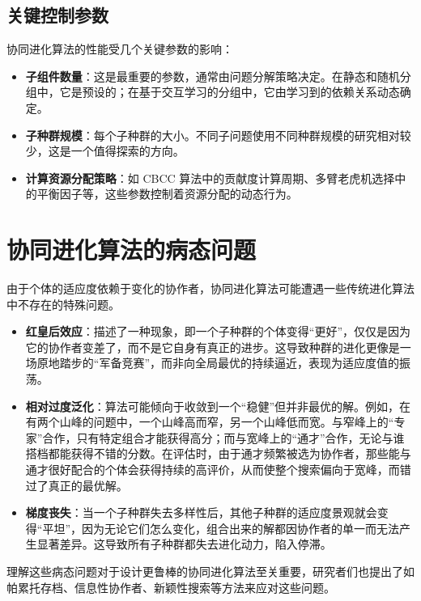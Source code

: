 \subsection{关键控制参数}
协同进化算法的性能受几个关键参数的影响：
    \begin{itemize}
        \item \textbf{子组件数量}：这是最重要的参数，通常由问题分解策略决定。在静态和随机分组中，它是预设的；在基于交互学习的分组中，它由学习到的依赖关系动态确定。
        \item \textbf{子种群规模}：每个子种群的大小。不同子问题使用不同种群规模的研究相对较少，这是一个值得探索的方向。
        \item \textbf{计算资源分配策略}：如 CBCC 算法中的贡献度计算周期、多臂老虎机选择中的平衡因子等，这些参数控制着资源分配的动态行为。
    \end{itemize}


\section{协同进化算法的病态问题}

由于个体的适应度依赖于变化的协作者，协同进化算法可能遭遇一些传统进化算法中不存在的特殊问题。

\begin{itemize}
    \item \textbf{红皇后效应}：描述了一种现象，即一个子种群的个体变得“更好”，仅仅是因为它的协作者变差了，而不是它自身有真正的进步。这导致种群的进化更像是一场原地踏步的“军备竞赛”，而非向全局最优的持续逼近，表现为适应度值的振荡。
    \item \textbf{相对过度泛化}：算法可能倾向于收敛到一个“稳健”但并非最优的解。例如，在有两个山峰的问题中，一个山峰高而窄，另一个山峰低而宽。与窄峰上的“专家”合作，只有特定组合才能获得高分；而与宽峰上的“通才”合作，无论与谁搭档都能获得不错的分数。在评估时，由于通才频繁被选为协作者，那些能与通才很好配合的个体会获得持续的高评价，从而使整个搜索偏向于宽峰，而错过了真正的最优解。
    \item \textbf{梯度丧失}：当一个子种群失去多样性后，其他子种群的适应度景观就会变得“平坦”，因为无论它们怎么变化，组合出来的解都因协作者的单一而无法产生显著差异。这导致所有子种群都失去进化动力，陷入停滞。
\end{itemize}

理解这些病态问题对于设计更鲁棒的协同进化算法至关重要，研究者们也提出了如帕累托存档、信息性协作者、新颖性搜索等方法来应对这些问题。

